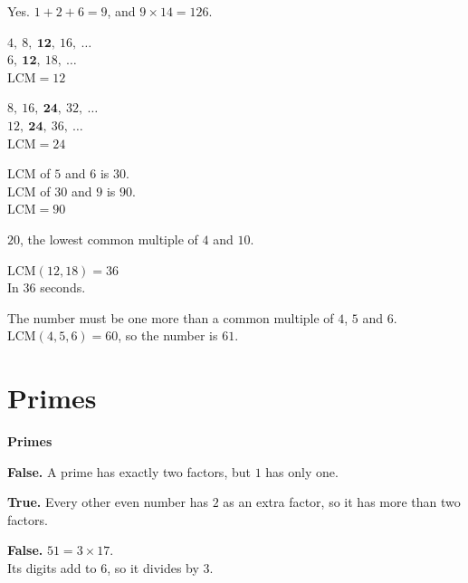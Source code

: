 \documentclass[aspectratio=169]{beamer}
\newcommand{\qtopic}[1]{%
  \section{#1}%
  \begin{frame}
    \vfill
    \begin{center}
      {\usebeamercolor[fg]{structure}\Huge\bfseries #1}
    \end{center}
    \vfill
  \end{frame}%
}
\begin{document}
  {Yes. $1+2+6=9$, and $9\times 14=126$.}

  {$4,\ 8,\ \mathbf{12},\ 16,\ \ldots$\\[0.3em]
   $6,\ \mathbf{12},\ 18,\ \ldots$\\[0.3em]
   $\mathrm{LCM}=12$}

  {$8,\ 16,\ \mathbf{24},\ 32,\ \ldots$\\[0.3em]
   $12,\ \mathbf{24},\ 36,\ \ldots$\\[0.3em]
   $\mathrm{LCM}=24$}

  {LCM of $5$ and $6$ is $30$.\\[0.3em]
   LCM of $30$ and $9$ is $90$.\\[0.3em]
   $\mathrm{LCM}=90$}

  {$20$, the lowest common multiple of $4$ and $10$.}

  {$\mathrm{LCM}(12,18)=36$\\[0.3em]
   In $36$ seconds.}

  {The number must be one more than a common multiple of $4$, $5$ and $6$.\\[0.3em]
   $\mathrm{LCM}(4,5,6)=60$, so the number is $61$.}

\qtopic{Primes}

  {\textbf{False.} A prime has exactly two factors, but $1$ has only one.}

  {\textbf{True.} Every other even number has $2$ as an extra factor,
   so it has more than two factors.}

  {\textbf{False.} $51=3\times 17$.\\[0.3em]
   Its digits add to $6$, so it divides by $3$.}
\end{document}
